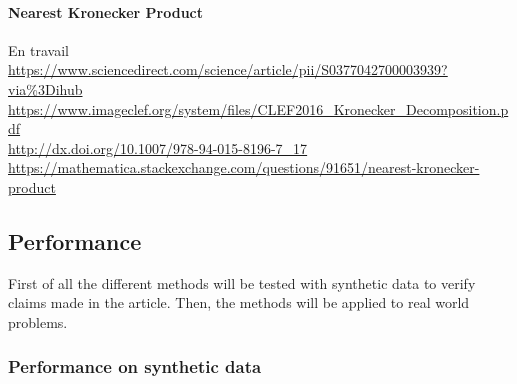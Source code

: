\documentclass{article}
\theoremstyle{definition}
\begin{document}
\paragraph{Nearest Kronecker Product}
En travail\\
\url{https://www.sciencedirect.com/science/article/pii/S0377042700003939?via\%3Dihub}\\
\url{https://www.imageclef.org/system/files/CLEF2016_Kronecker_Decomposition.pdf}\\
\url{http://dx.doi.org/10.1007/978-94-015-8196-7_17}\\
\url{https://mathematica.stackexchange.com/questions/91651/nearest-kronecker-product}\\
	

\subsection{Performance}
First of all the different methods will be tested with synthetic data to verify claims made in the article. Then, the methods will be applied to real world problems. 
\subsubsection{Performance on synthetic data}
\end{document}
